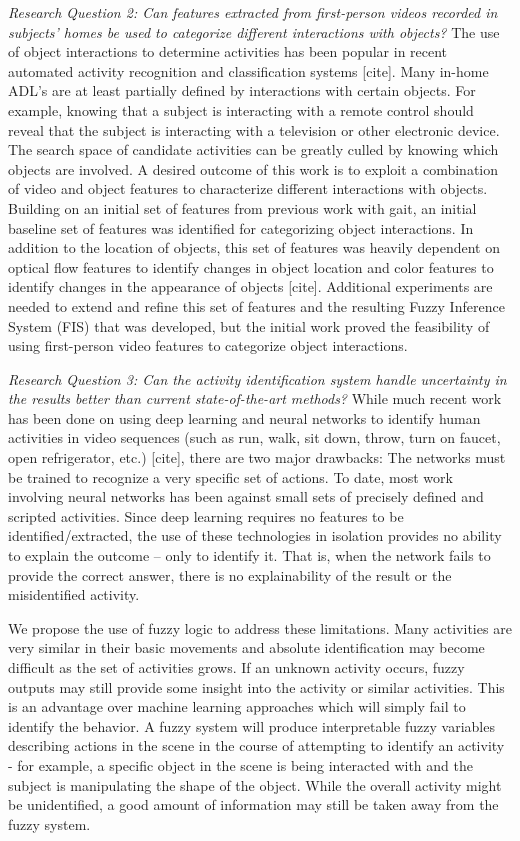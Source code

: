 \documentclass[12pt]{report}
\begin{document}
\emph{Research Question 2: Can features extracted from first-person videos recorded in subjects’ homes be used to categorize different interactions with objects?}
The use of object interactions to determine activities has been popular in recent automated activity recognition and classification systems [cite]. Many in-home ADL’s are at least partially defined by interactions with certain objects. For example, knowing that a subject is interacting with a remote control should reveal that the subject is interacting with a television or other electronic device. The search space of candidate activities can be greatly culled by knowing which objects are involved. A desired outcome of this work is to exploit a combination of video and object features to characterize different interactions with objects.
Building on an initial set of features from previous work with gait, an initial baseline set of features was identified for categorizing object interactions. In addition to the location of objects, this set of features was heavily dependent on optical flow features to identify changes in object location and color features to identify changes in the appearance of objects [cite]. Additional experiments are needed to extend and refine this set of features and the resulting Fuzzy Inference System (FIS) that was developed, but the initial work proved the feasibility of using first-person video features to categorize object interactions.

\emph{Research Question 3: Can the activity identification system handle uncertainty in the results better than current state-of-the-art methods?}
While much recent work has been done on using deep learning and neural networks to identify human activities in video sequences (such as run, walk, sit down, throw, turn on faucet, open refrigerator, etc.) [cite], there are two major drawbacks:
The networks must be trained to recognize a very specific set of actions. To date, most work involving neural networks has been against small sets of precisely defined and scripted activities.
Since deep learning requires no features to be identified/extracted, the use of these technologies in isolation provides no ability to explain the outcome – only to identify it. That is, when the network fails to provide the correct answer, there is no explainability of the result or the misidentified activity.
 
We propose the use of fuzzy logic to address these limitations. Many activities are very similar in their basic movements and absolute identification may become difficult as the set of activities grows. If an unknown activity occurs, fuzzy outputs may still provide some insight into the activity or similar activities. This is an advantage over machine learning approaches which will simply fail to identify the behavior. A fuzzy system will produce interpretable fuzzy variables describing actions in the scene in the course of attempting to identify an activity - for example, a specific object in the scene is being interacted with and the subject is manipulating the shape of the object. While the overall activity might be unidentified, a good amount of information may still be taken away from the fuzzy system.
\end{document}
